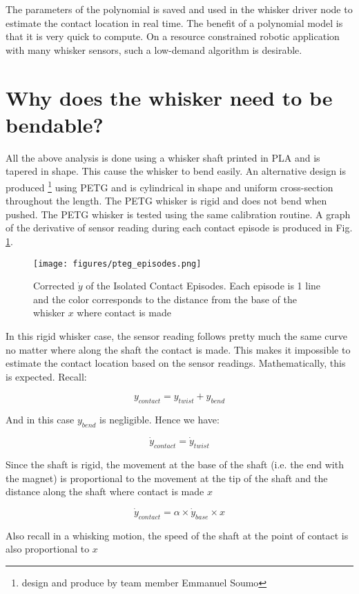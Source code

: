 \documentclass{report}
\begin{document}
The parameters of the polynomial is saved and used in the whisker driver node to estimate the contact location in real time. The benefit of a polynomial model is that it is very quick to compute. On a resource constrained robotic application with many whisker sensors, such a low-demand algorithm is desirable.

\section{Why does the whisker need to be bendable?}

All the above analysis is done using a whisker shaft printed in PLA and is tapered in shape. This cause the whisker to bend easily. An alternative design is produced \footnote{design and produce by team member Emmanuel Soumo} using PETG and is cylindrical in shape and uniform cross-section throughout the length. The PETG whisker is rigid and does not bend when pushed. The PETG whisker is tested using the same calibration routine. A graph of the derivative of sensor reading during each contact episode is produced in Fig. \ref*{fig:pteg_episodes.png}.

\begin{figure}[H]
    \centering
    \texttt{[image: figures/pteg\_episodes.png]}
    \caption{Corrected \(\dot{y}\) of the Isolated Contact Episodes. Each episode is 1 line and the color corresponds to the distance from the base of the whisker \(x\) where contact is made}
    \label{fig:pteg_episodes.png}
\end{figure}

In this rigid whisker case, the sensor reading follows pretty much the same curve no matter where along the shaft the contact is made. This makes it impossible to estimate the contact location based on the sensor readings. Mathematically, this is expected. Recall:

    \[y_{contact} = y_{twist} + y_{bend}\]

And in this case \(y_{bend}\) is negligible. Hence we have:

    \[\dot{y}_{contact} = \dot{y}_{twist}\]

Since the shaft is rigid, the movement at the base of the shaft (i.e. the end with the magnet) is proportional to the movement at the tip of the shaft and the distance along the shaft where contact is made \(x\)

    \[\dot{y}_{contact} = \alpha\times\dot{y}_{base}\times x\]

Also recall in a whisking motion, the speed of the shaft at the point of contact is also proportional to \(x\)
\end{document}
